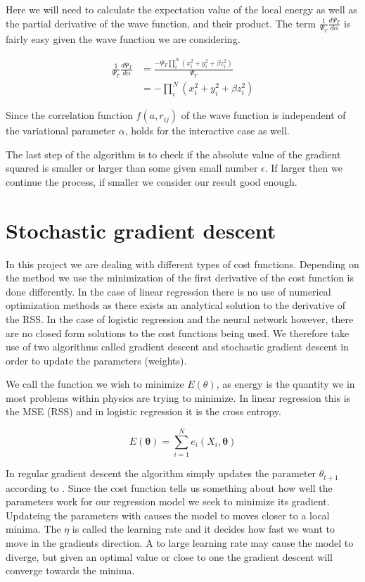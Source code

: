 Here we will need to calculate the expectation value of the local energy as well as the partial derivative of the wave function, and their product. The term $\frac{1}{\Psi_T}\frac{d \Psi_T}{d \alpha}$ is fairly easy given the wave function we are considering. 

\begin{align} 
\frac{1}{\Psi_T}\frac{d \Psi_T}{d \alpha} &= \frac{-\Psi_T \prod_i^N (x_i^2 + y_i^2 + \beta z^2_i)}{\Psi_T} \\
&= -\prod_i^N (x_i^2 + y_i^2 + \beta z^2_i) \label{eq:frac_deri_wf}
\end{align}

Since the correlation function $f(a, r_{ij})$ of the wave function is independent of the variational parameter $\alpha$,  holds for the interactive case as well.

The last step of the algorithm is to check if the absolute value of the gradient squared is smaller or larger than some given small number $\epsilon$. If larger then we continue the process, if smaller we consider our result good enough. 

\section{Stochastic gradient descent}

In this project we are dealing with different types of cost functions. Depending on the method we use the minimization of the first derivative of the cost function is done differently. In the case of linear regression there is no use of numerical optimization methods as there exists an analytical solution to the derivative of the RSS. In the case of logistic regression and the neural network however, there are no closed form solutions to the cost functions being used. We therefore take use of two algorithms called gradient descent and stochastic gradient descent in order to update the parameters (weights).

We call the function we wish to minimize $E(\theta)$, as energy is the quantity we in most problems within physics are trying to minimize. In linear regression this is the MSE (RSS) and in logistic regression it is the cross entropy. 

\begin{equation}
E(\mathbf{\theta}) = \sum_{i=1}^N e_i(X_i, \mathbf{\theta}) 
\end{equation}


In regular gradient descent the algorithm simply updates the parameter $\theta_{t+1}$ according to . Since the cost function tells us something about how well the parameters work for our regression model we seek to minimize its gradient. Updateing the parameters with  causes the model to moves closer to a local minima. The $\eta$ is called the learning rate and it decides how fast we want to move in the gradients direction. A to large learning rate may cause the model to diverge, but given an optimal value or close to one the gradient descent will converge towards the minima.  

